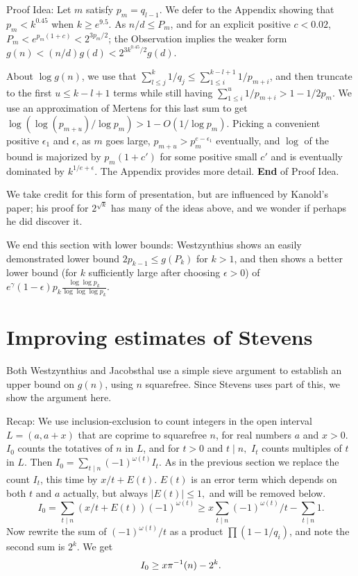 \documentclass[12pt,leqno]{article}
\begin{document}
Proof Idea:  Let $m$ satisfy $p_m=q_{l-1}$. We defer to the Appendix showing 
that $p_m \lt k^{0.45}$ when $k \geq e^{9.5}$.
As $n/d \leq P_m$, and for an explicit
positive $c \lt 0.02$, $P_m \lt e^{p_m(1+c)} \lt 2^{3p_m/2}$; 
the Observation implies the weaker form 
$g(n) \lt (n/d)g(d) \lt 2^{3k^{0.45}/2}g(d)$.

About $\log g(n)$, we use that 
$\sum_{l \leq j}^k 1/q_j \leq \sum_{1\leq i}^{k-l+1} 1/p_{m+i}$, and 
then truncate to the first $u \leq k-l+1$ terms while still having
$\sum_{1 \leq i}^u 1/p_{m+i} \gt 1 - 1/2p_m$.  We use an 
approximation of Mertens for this last sum to get 
$\log(\log(p_{m+u})/\log p_m ) \gt 1 - O(1/\log p_m)$. Picking
a convenient positive $\epsilon_1$ and $\epsilon$, as 
$m$ goes large, $p_{m+u} \gt  p_m^{e - \epsilon_1}$ eventually, 
and $\log$ of the bound is majorized by $p_m(1+c')$ for some
positive small $c'$ 
and is eventually dominated by $k^{1/e + \epsilon}$.
The Appendix provides more detail.  
\textbf{End} of Proof Idea.
 
We take credit for this form of presentation, but are 
influenced by Kanold's paper;  his proof for $2^{\sqrt{k}}$
has many of the ideas above, and we wonder if perhaps
he did discover it.

We end this section with lower bounds:
Westzynthius shows an easily demonstrated lower bound 
$2p_{k-1} \leq g(P_k)$  for $k \gt 1$, and then shows a better
lower bound (for $k$ sufficiently large after choosing $\epsilon \gt 0$) of 
$e^{\gamma}(1- \epsilon) p_k \frac{\log\log p_k}{\log\log\log p_k}$. 

\section{Improving estimates of Stevens}

Both Westzynthius and Jacobsthal use a simple sieve argument to
establish an upper bound on $g(n)$, using $n$ squarefree.  
Since Stevens uses part of 
this, we show the argument here.  

Recap: We use inclusion-exclusion to count integers in the open interval
$L=(a, a+x)$ that are coprime to squarefree $n$,
 for real numbers $a$ and 
$x \gt 0$.  $I_0$ counts the totatives of $n$ in $L$, 
 and for $t \gt 0$ and $t \mid n,$ $I_t$ 
counts multiples of $t$ in $L$. 
Then $I_0 = \sum_{t\mid n} (-1)^{\omega(t)}I_t.$
As in the previous section we replace the count
$I_t$, this time by $x/t + E(t)$.  $E(t)$ is an error term which depends 
on both $t$ and $a$ actually, but always $|E(t)| \leq 1,$
and will be removed below.
$$I_0 = \sum_{t \mid n} (x/t + E(t))(-1)^{\omega(t)} \geq 
x \sum_{t \mid n} (-1)^{\omega(t)}/t - \sum_{t \mid n} 1 .$$ 
Now rewrite the sum of $(-1)^{\omega(t)}/t$ as a product 
$\prod (1 - 1/q_i)$, and note the second sum is $2^k$. We get
$$I_0 \geq x{\pi}^{-1}(n) -2^k .$$
\end{document}
